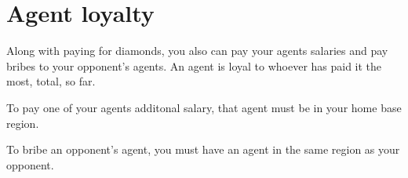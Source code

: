 \documentclass[12pt]{article}
\begin{document}
\section{Agent loyalty}
Along with paying for diamonds, you also can pay your agents salaries and pay bribes to your opponent's agents.  An agent is loyal to whoever has paid it the most, total, so far.

To pay one of your agents additonal salary, that agent must be in your home base region.

To bribe an opponent's agent, you must have an agent in the same region as your opponent.
\end{document}
